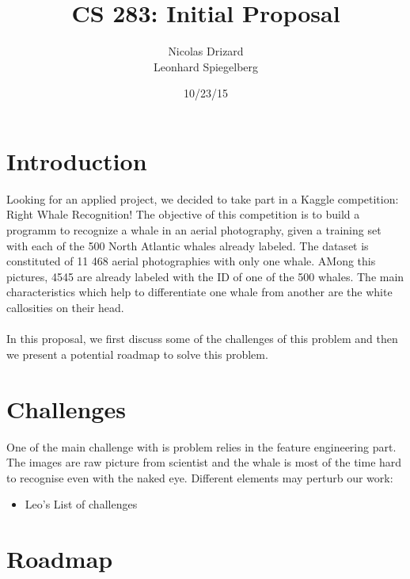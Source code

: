 \documentclass[11pt,a4paper,oneside]{report}
\begin{document}
\title{CS 283: Initial Proposal}
\author{Nicolas Drizard \\
Leonhard Spiegelberg}
\date{10/23/15}

\maketitle

\newpage

\section*{Introduction}

Looking for an applied project, we decided to take part in a Kaggle competition: Right Whale Recognition! The objective of this competition is to build a programm to recognize a whale in an aerial photography, given a training set with each of the 500 North Atlantic whales already labeled. The dataset is constituted of 11 468  aerial photographies with only one whale. AMong this pictures, 4545 are already labeled with the ID of one of the 500 whales. The main characteristics which help to differentiate one whale from another are the white callosities on their head.\\
\\

In this proposal, we first discuss some of the challenges of this problem and then we present a potential roadmap to solve this problem.


\section*{Challenges}

One of the main challenge with is problem relies in the feature engineering part. The images are raw picture from scientist and the whale is most of the time hard to recognise even with the naked eye. Different elements may perturb our work:
\begin{itemize}
	\item Leo's List of challenges
\end{itemize}


\section*{Roadmap}
\end{document}
